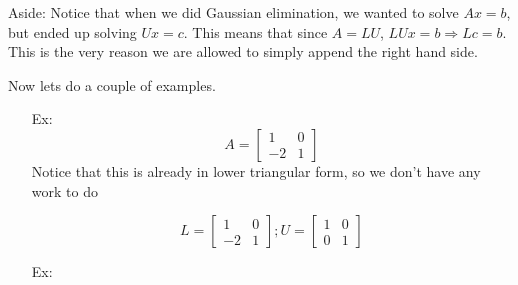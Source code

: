 \documentclass[reqno]{amsart}
\theoremstyle{definition}
\begin{document}
Aside:  Notice that when we did Gaussian elimination, we wanted to solve $Ax = b$, but ended up
solving $Ux = c$.  This means that since $A = LU$, $LUx = b \Rightarrow Lc = b$.  This is the very
reason we are allowed to simply append the right hand side.

Now lets do a couple of examples.

\begin{enumerate}

\item[Ex:  ]  
%
\begin{equation*}
A = \begin{bmatrix}
1 & 0\\
-2 & 1
\end{bmatrix}
\end{equation*}
%
Notice that this is already in lower triangular form, so we don't have any work to do

\begin{equation*}
L = \begin{bmatrix}
1 & 0\\
-2 & 1
\end{bmatrix};  U = \begin{bmatrix}
1 & 0\\
0 & 1
\end{bmatrix}
\end{equation*}

\item[Ex:  ]  


\end{enumerate}
\end{document}
